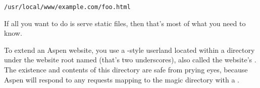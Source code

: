 \begin{verbatim}
/usr/local/www/example.com/foo.html
\end{verbatim}

If all you want to do is serve static files, then that's most of what you need
to know.

To extend an Aspen website, you use a \UNIX{}-style userland located within a
directory under the website root named \dfn{__} (that's two underscores), also
called the website's . The existence and contents of this
directory are safe from prying eyes, because Aspen will respond to any requests
mapping to the magic directory with a .

